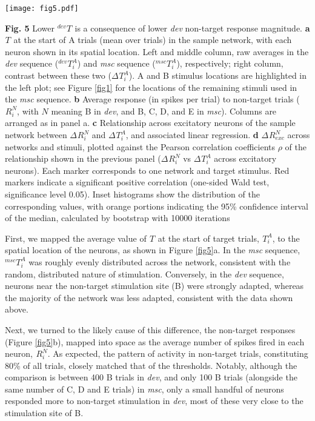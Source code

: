 \documentclass[pdflatex,referee,iicol,sn-basic]{sn-jnl}
\newcommand{\dev}{\textit{dev}}
\newcommand{\msc}{\textit{msc}}
\renewcommand{\R}[3][]{{}^{#1}_{}\!R^{#2}_{#3}}
\renewcommand{\T}[3][]{{}^{#1}_{}T^{#2}_{#3}}
\theoremstyle{thmstyleone}%
\theoremstyle{thmstyletwo}%
\theoremstyle{thmstylethree}%
\begin{document}
\begin{figure*}%
    \centering
    \texttt{[image: fig5.pdf]}
    \caption{}
    \label{fig5}
\end{figure*}
\textbf{Fig. 5} Lower $\T[dev]{}{}$ is a consequence of lower \dev{} non-target response magnitude.
\textbf{a} $\T{}{}$ at the start of A trials (mean over trials) in the sample network, with each neuron shown in its spatial location. Left and middle column, raw averages in the \dev{} sequence ($\T[dev]{A}{i}$) and \msc{} sequence ($\T[msc]{A}{i}$), respectively; right column, contrast between these two ($\Delta \T{A}{i}$). A and B stimulus locations are highlighted in the left plot; see Figure \ref{fig1} for the locations of the remaining stimuli used in the \msc{} sequence.
\textbf{b} Average response (in spikes per trial) to non-target trials ($\R{N}{i}$, with $N$ meaning B in \dev{}, and B, C, D, and E in \msc{}). Columns are arranged as in panel a.
\textbf{c} Relationship across excitatory neurons of the sample network between $\Delta \R{N}{i}$ and $\Delta \T{A}{i}$, and associated linear regression.
\textbf{d} $\Delta \R{N}{exc}$ across networks and stimuli, plotted against the Pearson correlation coefficients $\rho$ of the relationship shown in the previous panel ($\Delta \R{N}{i}$ vs $\Delta \T{A}{i}$ across excitatory neurons). Each marker corresponds to one network and target stimulus. Red markers indicate a significant positive correlation (one-sided Wald test, significance level 0.05). Inset histograms show the distribution of the corresponding values, with orange portions indicating the 95\% confidence interval of the median, calculated by bootstrap with 10000 iterations

First, we mapped the average value of $\T{}{}$ at the start of target trials, $\T{A}{i}$, to the spatial location of the neurons, as shown in Figure \ref{fig5}a. In the \msc{} sequence, $\T[msc]{A}{i}$ was roughly evenly distributed across the network, consistent with the random, distributed nature of stimulation. Conversely, in the \dev{} sequence, neurons near the non-target stimulation site (B) were strongly adapted, whereas the majority of the network was less adapted, consistent with the data shown above.

Next, we turned to the likely cause of this difference, the non-target responses (Figure \ref{fig5}b), mapped into space as the average number of spikes fired in each neuron, $\R{N}{i}$. As expected, the pattern of activity in non-target trials, constituting 80\% of all trials, closely matched that of the thresholds. Notably, although the comparison is between 400 B trials in \dev{}, and only 100 B trials (alongside the same number of C, D and E trials) in \msc{}, only a small handful of neurons responded more to non-target stimulation in \dev{}, most of these very close to the stimulation site of B.
\end{document}
